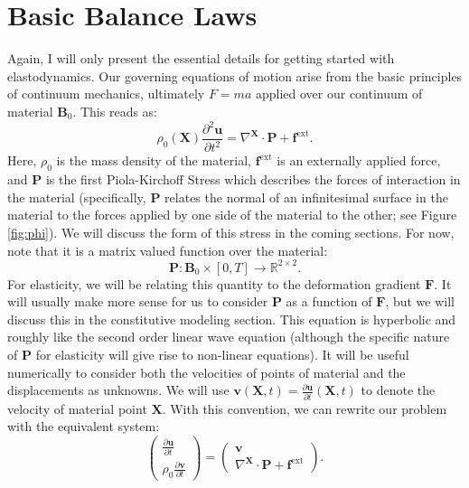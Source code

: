 \section*{Basic Balance Laws}

Again, I will only present the essential details for getting started with elastodynamics. Our governing equations of motion arise from the basic principles of continuum mechanics, ultimately $F = ma$ applied over our continuum of material $\mathbf{B}_0$. This reads as:
\begin{equation*}
\rho_0(\mathbf{X}) \frac{\partial^2 \mathbf{u}}{\partial t^2} = \nabla^{\mathbf{X}} \cdot \mathbf{P} + \mathbf{f}^{\text{ext}}.
\end{equation*}
Here, $\rho_0$ is the mass density of the material, $\mathbf{f}^\text{ext}$ is an externally applied force, and $\mathbf{P}$ is the first Piola-Kirchoff Stress which describes the forces of interaction in the material (specifically, $\mathbf{P}$ relates the normal of an infinitesimal surface in the material to the forces applied by one side of the material to the other; see Figure \ref{fig:phi}). We will discuss the form of this stress in the coming sections. For now, note that it is a matrix valued function over the material:
\begin{equation*}
\mathbf{P} \colon \mathbf{B}_0 \times [0,T] \to \mathbb{R}^{2\times2}.
\end{equation*}
For elasticity, we will be relating this quantity to the deformation gradient $\mathbf{F}$. It will usually make more sense for us to consider $\mathbf{P}$ as a function of $\mathbf{F}$, but we will discuss this in the constitutive modeling section. This equation is hyperbolic and roughly like the second order linear wave equation (although the specific nature of $\mathbf{P}$ for elasticity will give rise to non-linear equations). It will be useful numerically to consider both the velocities of points of material and the displacements as unknowns. We will use $\mathbf{v}(\mathbf{X},t) = \frac{\partial\mathbf{u}}{\partial t}(\mathbf{X},t)$ to denote the velocity of material point $\mathbf{X}$. With this convention, we can rewrite our problem with the equivalent system:
\begin{equation*}
\begin{pmatrix}
\frac{\partial\mathbf{u}}{\partial t} \\
\rho_0 \frac{\partial\mathbf{v}}{\partial t}
\end{pmatrix}
= \begin{pmatrix}
\mathbf{v} \\
\nabla^{\mathbf{X}} \cdot \mathbf{P} + \mathbf{f}^{\text{ext}}
\end{pmatrix}.
\end{equation*}

